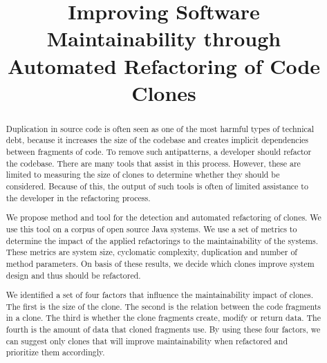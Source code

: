 \documentclass[conference]{IEEEtran}
\begin{document}
\title{Improving Software Maintainability through Automated Refactoring of Code Clones}

\author{
\and
{}
}

\maketitle

\begin{abstract}
Duplication in source code is often seen as one of the most harmful types of technical debt, because it increases the size of the codebase and creates implicit dependencies between fragments of code. To remove such antipatterns, a developer should refactor the codebase. There are many tools that assist in this process. However, these are limited to measuring the size of clones to determine whether they should be considered. Because of this, the output of such tools is often of limited assistance to the developer in the refactoring process.

We propose method and tool for the detection and automated refactoring of clones. We use this tool on a corpus of open source Java systems. We use a set of metrics to determine the impact of the applied refactorings to the maintainability of the systems. These metrics are system size, cyclomatic complexity, duplication and number of method parameters. On basis of these results, we decide which clones improve system design and thus should be refactored.

We identified a set of four factors that influence the maintainability impact of clones. The first is the size of the clone. The second is the relation between the code fragments in a clone. The third is whether the clone fragments create, modify or return data. The fourth is the amount of data that cloned fragments use. By using these four factors, we can suggest only clones that will improve maintainability when refactored and prioritize them accordingly.
\end{abstract}
\end{document}
